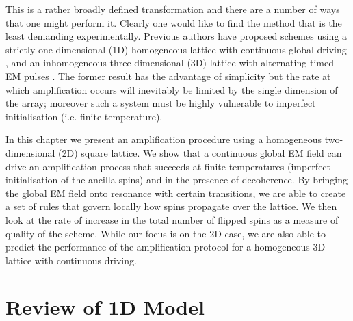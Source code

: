 This is a rather broadly defined transformation and there are a number of ways that one might perform it. Clearly one would like to find the method that is the least demanding experimentally. Previous authors have proposed schemes using a strictly one-dimensional (1D) homogeneous lattice with continuous global driving \cite{Lee:2005p6468}, and an inhomogeneous three-dimensional (3D) lattice with alternating timed EM pulses \cite{PerezDelgado:2006p6542}. The former result has the advantage of simplicity but the rate at which amplification occurs will inevitably be limited by the single dimension of the array; moreover such a system must be highly vulnerable to imperfect initialisation (i.e. finite temperature).

In this chapter we present an amplification procedure using a homogeneous two-dimensional (2D) square lattice. We show that a continuous global EM field can drive an amplification process that succeeds at finite temperatures (imperfect initialisation of the ancilla spins) and in the presence of decoherence. By bringing the global EM field onto resonance with certain transitions, we are able to create a set of rules that govern locally how spins propagate over the lattice. We then look at the rate of increase in the total number of flipped spins as a measure of quality of the scheme. While our focus is on the 2D case, we are also able to predict the performance of the amplification protocol for a homogeneous 3D lattice with continuous driving.

\section{Review of 1D Model}

